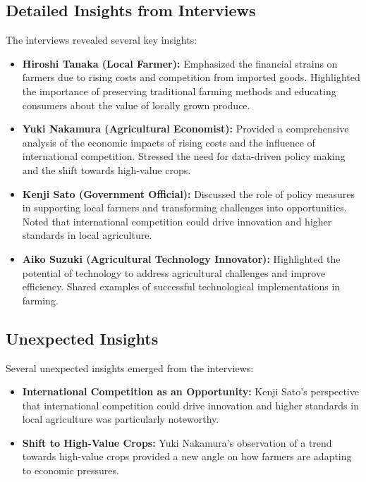 \documentclass{article} %
\begin{document}
\subsection{Detailed Insights from Interviews}

The interviews revealed several key insights:

\begin{itemize}
    \item \textbf{Hiroshi Tanaka (Local Farmer):} Emphasized the financial strains on farmers due to rising costs and competition from imported goods. Highlighted the importance of preserving traditional farming methods and educating consumers about the value of locally grown produce.
    \item \textbf{Yuki Nakamura (Agricultural Economist):} Provided a comprehensive analysis of the economic impacts of rising costs and the influence of international competition. Stressed the need for data-driven policy making and the shift towards high-value crops.
    \item \textbf{Kenji Sato (Government Official):} Discussed the role of policy measures in supporting local farmers and transforming challenges into opportunities. Noted that international competition could drive innovation and higher standards in local agriculture.
    \item \textbf{Aiko Suzuki (Agricultural Technology Innovator):} Highlighted the potential of technology to address agricultural challenges and improve efficiency. Shared examples of successful technological implementations in farming.
\end{itemize}

\subsection{Unexpected Insights}

Several unexpected insights emerged from the interviews:

\begin{itemize}
    \item \textbf{International Competition as an Opportunity:} Kenji Sato's perspective that international competition could drive innovation and higher standards in local agriculture was particularly noteworthy.
    \item \textbf{Shift to High-Value Crops:} Yuki Nakamura's observation of a trend towards high-value crops provided a new angle on how farmers are adapting to economic pressures.
\end{itemize}
\end{document}
